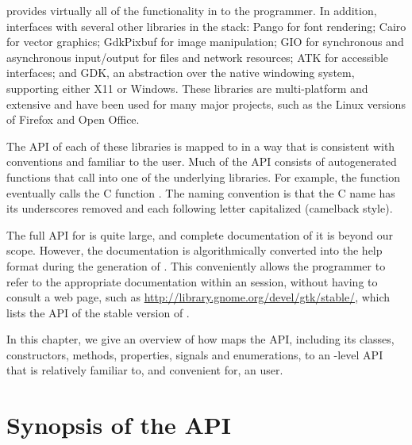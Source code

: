  provides virtually all of the functionality in \GTK\/ to
the \R\/ programmer. In addition,  interfaces with several
other libraries in the \GTK\/ stack: Pango for font rendering; Cairo
for vector graphics; GdkPixbuf for image manipulation; GIO for
synchronous and asynchronous input/output for files and network
resources; ATK for accessible interfaces; and GDK, an abstraction over
the native windowing system, supporting either X11 or Windows. These
libraries are multi-platform and extensive and have been used for many
major projects, such as the Linux versions of Firefox and Open Office.

The API of each of these libraries is mapped to \R\/ in a way that is
consistent with \R\/ conventions and familiar to the \R\/
user. Much of the  API consists of autogenerated \R\/
functions that call into one of the underlying libraries. For
example, the \R\/ function  eventually calls
the C function . The naming convention is
that the C name has its underscores removed and each following letter
capitalized (camelback style).

The full API for \GTK\/ is quite large, and complete documentation of
it is beyond our scope. However, the \GTK\/ documentation is
algorithmically converted into the \R\/ help format during the
generation of . This conveniently allows the programmer to
refer to the appropriate documentation within an \R\/ session, without
having to consult a web page, such as
\url{http://library.gnome.org/devel/gtk/stable/}, which lists the
 API of the stable version of \GTK.

In this chapter, we give an overview of how  maps the
\GTK\/ API, including its classes, constructors, methods, properties,
signals and enumerations, to an \R-level API that is relatively
familiar to, and convenient for, an \R\/ user. 


\section{Synopsis of the  API}

